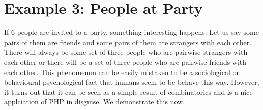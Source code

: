 \section{Example 3: People at Party}

If $6$ people are invited to a party, something interesting happens. Let us say some pairs of them are friends and some pairs of them are strangers with each other. There will always be some set of three people who are pairwise strangers with each other or there will be a set of three people who are pairwise friends with each other. This phenomenon can be easily mistaken to be a sociological or behavioural psychological fact that humans seem to be behave this way. However, it turns out that it can be seen as a simple result of combinatorics and is a nice applciation of PHP in disguise. We demonstrate this now.

